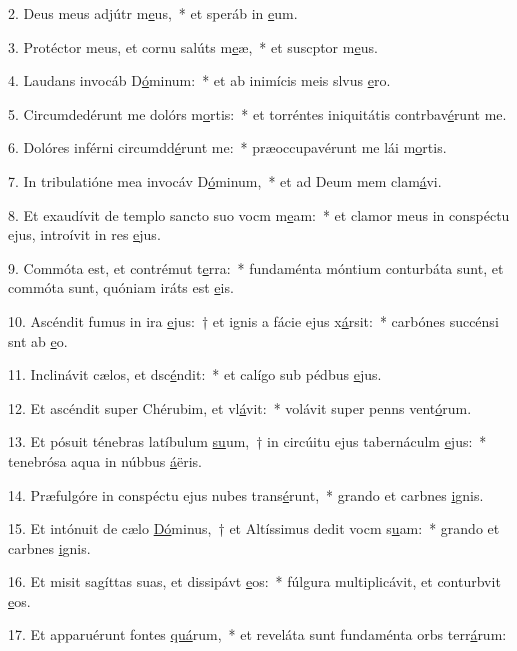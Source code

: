 2. Deus meus adjútr m\uline{e}us,~* et speráb in \uline{e}um.\par 
3. Protéctor meus, et cornu salúts m\uline{e}æ,~* et suscptor m\uline{e}us.\par 
4. Laudans invocáb D\uline{ó}minum:~* et ab inimícis meis slvus \uline{e}ro.\par 
5. Circumdedérunt me dolórs m\uline{o}rtis:~* et torréntes iniquitátis contrbav\uline{é}runt me.\par 
6. Dolóres inférni circumdd\uline{é}runt me:~* præoccupavérunt me lái m\uline{o}rtis.\par 
7. In tribulatióne mea invocáv D\uline{ó}minum,~* et ad Deum mem clam\uline{á}vi.\par 
8. Et exaudívit de templo sancto suo vocm m\uline{e}am:~* et clamor meus in conspéctu ejus, introívit in res \uline{e}jus.\par 
9. Commóta est, et contrémut t\uline{e}rra:~* fundaménta móntium conturbáta sunt, et commóta sunt, quóniam iráts est \uline{e}is.\par 
10. Ascéndit fumus in ira \uline{e}jus:~† et ignis a fácie ejus x\uline{á}rsit:~* carbónes succénsi snt ab \uline{e}o.\par 
11. Inclinávit cælos, et dsc\uline{é}ndit:~* et calígo sub pédbus \uline{e}jus.\par 
12. Et ascéndit super Chérubim, et vl\uline{á}vit:~* volávit super penns vent\uline{ó}rum.\par 
13. Et pósuit ténebras latíbulum \uline{su}um,~† in circúitu ejus tabernáculm \uline{e}jus:~* tenebrósa aqua in núbbus \uline{á}ëris.\par 
14. Præfulgóre in conspéctu ejus nubes trans\uline{é}runt,~* grando et carbnes \uline{i}gnis.\par 
15. Et intónuit de cælo \uline{Dó}minus,~† et Altíssimus dedit vocm s\uline{u}am:~* grando et carbnes \uline{i}gnis.\par 
16. Et misit sagíttas suas, et dissipávt \uline{e}os:~* fúlgura multiplicávit, et conturbvit \uline{e}os.\par 
17. Et apparuérunt fontes \uline{quá}rum,~* et reveláta sunt fundaménta orbs terr\uline{á}rum:\par 

